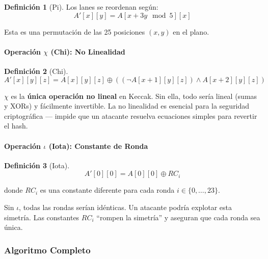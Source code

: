 \documentclass[11pt,a4paper,twoside,openright]{book}
\theoremstyle{definition}
\newtheorem{definition}{Definición}[chapter]
\theoremstyle{plain}
\theoremstyle{remark}
\begin{document}
\begin{definition}[Pi]
Los lanes se reordenan según:
\[ A'[x][y] = A[x + 3y \mod 5][x] \]

Esta es una permutación de las 25 posiciones $(x, y)$ en el plano.
\end{definition}

\paragraph{Operación $\chi$ (Chi): No Linealidad}

\begin{definition}[Chi]
\[ A'[x][y][z] = A[x][y][z] \oplus ((\neg A[x+1][y][z]) \land A[x+2][y][z]) \]
\end{definition}

\begin{keyidea}
$\chi$ es la \textbf{única operación no lineal} en Keccak. Sin ella, todo sería lineal (sumas y XORs) y fácilmente invertible. La no linealidad es esencial para la seguridad criptográfica --- impide que un atacante resuelva ecuaciones simples para revertir el hash.
\end{keyidea}

\paragraph{Operación $\iota$ (Iota): Constante de Ronda}

\begin{definition}[Iota]
\[ A'[0][0] = A[0][0] \oplus RC_i \]

donde $RC_i$ es una constante diferente para cada ronda $i \in \{0, \ldots, 23\}$.
\end{definition}

\begin{intuicion}
Sin $\iota$, todas las rondas serían idénticas. Un atacante podría explotar esta simetría. Las constantes $RC_i$ ``rompen la simetría'' y aseguran que cada ronda sea única.
\end{intuicion}

\subsubsection{Algoritmo Completo}
\end{document}
